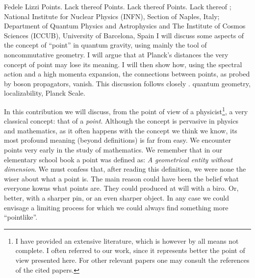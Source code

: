 \begin{artengenv}{Fedele Lizzi}
	{Points. Lack thereof}
	{Points. Lack thereof}
	{Points. Lack thereof}
	{;\\
	National Institute for Nuclear Physics (INFN), Section of Naples, Italy;\\
	Department of Quantum Physics and Astrophysics and The Institute of Cosmos Sciences (ICCUB),
	University of Barcelona, Spain}
	{I will discuss some aspects of the concept of ``point'' in quantum gravity, using mainly the tool of noncommutative geometry. I will argue that at Planck's distances the very concept of point may lose its meaning. I will then show how, using the spectral action and a high momenta expansion,  the connections between points, as probed by boson propagators, vanish. This discussion follows closely \parencite{Kuliva}.}
	{quantum geometry, localizability, Planck Scale.}
	



\lettrine[loversize=0.13,lines=2,lraise=-0.05,nindent=0em,findent=0.2pt]%
{I}{}n this contribution we will discuss, from the point of view of a physicist\footnote{I have provided an extensive literature, which is however by all means not complete. I often referred to our work, since it represents better the point of view presented here. For other relevant papers one may consult the references of the cited papers.}, a very classical concept: that of a \emph{point}. Although the concept is pervasive in physics and mathematics, as it often happens with the concept we think we know, its most profound meaning (beyond definitions) is far from easy. We encounter points very early in the study of mathematics. We remember that in our elementary school book a point was defined as: \emph{A geometrical entity without dimension}. We must confess that, after reading this definition, we were none the wiser about what a point is. The main reason could have been the belief what everyone kowns what  points are. They could produced at will with a biro. Or, better, with a sharper pin, or an even sharper object. In any case we could envisage a limiting process for which we could always find something more ``pointlike''.


\end{artengenv}

